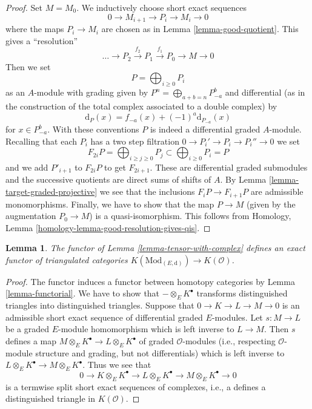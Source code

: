 \documentclass{stacks-project}
\theoremstyle{plain}
\newtheorem{lemma}[subsection]{Lemma}
\theoremstyle{definition}
\theoremstyle{remark}
\numberwithin{equation}{subsection}
\begin{document}
\begin{proof}
Set $M = M_0$. We inductively choose short exact sequences
$$
0 \to M_{i + 1} \to P_i \to M_i \to 0
$$
where the maps $P_i \to M_i$ are chosen as in Lemma \ref{lemma-good-quotient}.
This gives a ``resolution''
$$
\ldots \to P_2 \xrightarrow{f_2} P_1 \xrightarrow{f_1} P_0 \to M \to 0
$$
Then we set
$$
P = \bigoplus\nolimits_{i \geq 0} P_i
$$
as an $A$-module with grading given by
$P^n = \bigoplus_{a + b = n} P_{-a}^b$ and
differential (as in the construction of the total complex associated
to a double complex) by
$$
\text{d}_P(x) = f_{-a}(x) + (-1)^a \text{d}_{P_{-a}}(x)
$$
for $x \in P_{-a}^b$. With these conventions $P$ is indeed a differential
graded $A$-module. Recalling that each $P_i$ has a two step filtration
$0 \to P_i' \to P_i \to P_i'' \to 0$ we set
$$
F_{2i}P = \bigoplus\nolimits_{i \geq j \geq 0} P_j
\subset
\bigoplus\nolimits_{i \geq 0} P_i = P
$$
and we add $P'_{i + 1}$ to $F_{2i}P$ to get $F_{2i + 1}$.
These are differential graded submodules and the successive quotients
are direct sums of shifts of $A$. By
Lemma \ref{lemma-target-graded-projective} we see that
the inclusions $F_iP \to F_{i + 1}P$ are admissible monomorphisms.
Finally, we have to show that the map $P \to M$ (given by the
augmentation $P_0 \to M$) is a quasi-isomorphism. This follows from
Homology, Lemma \ref{homology-lemma-good-resolution-gives-qis}.
\end{proof}

\begin{lemma}
\label{lemma-tensor-with-complex-homotopy}
The functor of Lemma \ref{lemma-tensor-with-complex} defines an exact functor
of triangulated categories
$K(\text{Mod}_{(E, \text{d})}) \to K(\mathcal{O})$.
\end{lemma}

\begin{proof}
The functor induces a functor between homotopy categories by
Lemma \ref{lemma-functorial}.
We have to show that $- \otimes_E K^\bullet$ transforms distinguished
triangles into distinguished triangles.
Suppose that $0 \to K \to L \to M \to 0$ is an admissible short
exact sequence of differential graded $E$-modules. Let $s : M \to L$ be
a graded $E$-module homomorphism which is left inverse to $L \to M$.
Then $s$ defines a map $M \otimes_E K^\bullet \to L \otimes_E K^\bullet$
of graded $\mathcal{O}$-modules (i.e., respecting $\mathcal{O}$-module
structure and grading, but not differentials)
which is left inverse to $L \otimes_E K^\bullet \to M \otimes_E K^\bullet$.
Thus we see that
$$
0 \to K \otimes_E K^\bullet \to L \otimes_E K^\bullet \to
M \otimes_E K^\bullet \to 0
$$
is a termwise split short exact sequences of complexes, i.e., a
defines a distinguished triangle in $K(\mathcal{O})$.
\end{proof}
\end{document}
